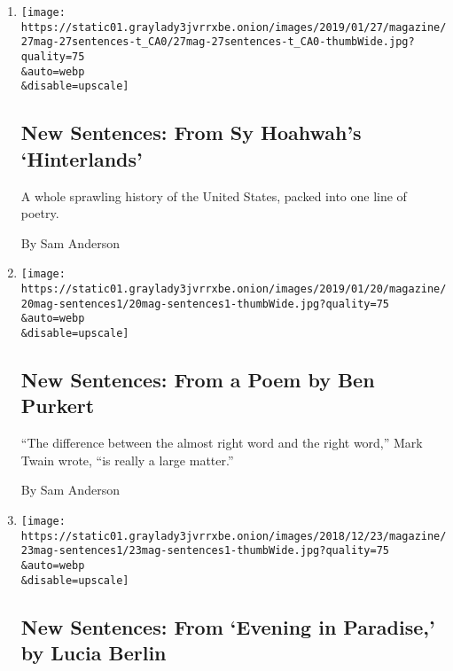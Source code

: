 \begin{enumerate}
\def\labelenumi{\arabic{enumi}.}
\item
  \href{/2019/01/25/magazine/new-sentences-from-sy-hoahwahs-hinterlands.html}{}

  \texttt{[image: https://static01.graylady3jvrrxbe.onion/images/2019/01/27/magazine/27mag-27sentences-t\_CA0/27mag-27sentences-t\_CA0-thumbWide.jpg?quality=75\\\&auto=webp\\\&disable=upscale]}

  \hypertarget{new-sentences-from-sy-hoahwahs-hinterlands}{%
  \subsection{New Sentences: From Sy Hoahwah's
  `Hinterlands'}\label{new-sentences-from-sy-hoahwahs-hinterlands}}

  A whole sprawling history of the United States, packed into one line
  of poetry.

  By Sam Anderson
\item
  \href{/2019/01/18/magazine/new-sentences-from-a-poem-by-ben-purkert.html}{}

  \texttt{[image: https://static01.graylady3jvrrxbe.onion/images/2019/01/20/magazine/20mag-sentences1/20mag-sentences1-thumbWide.jpg?quality=75\\\&auto=webp\\\&disable=upscale]}

  \hypertarget{new-sentences-from-a-poem-by-ben-purkert}{%
  \subsection{New Sentences: From a Poem by Ben
  Purkert}\label{new-sentences-from-a-poem-by-ben-purkert}}

  ``The difference between the almost right word and the right word,''
  Mark Twain wrote, ``is really a large matter.''

  By Sam Anderson
\item
  \href{/2018/12/21/magazine/new-sentences-from-evening-in-paradise-by-lucia-berlin.html}{}

  \texttt{[image: https://static01.graylady3jvrrxbe.onion/images/2018/12/23/magazine/23mag-sentences1/23mag-sentences1-thumbWide.jpg?quality=75\\\&auto=webp\\\&disable=upscale]}

  \hypertarget{new-sentences-from-evening-in-paradise-by-lucia-berlin}{%
  \subsection{New Sentences: From `Evening in Paradise,' by Lucia
  Berlin}\label{new-sentences-from-evening-in-paradise-by-lucia-berlin}}


\end{enumerate}
